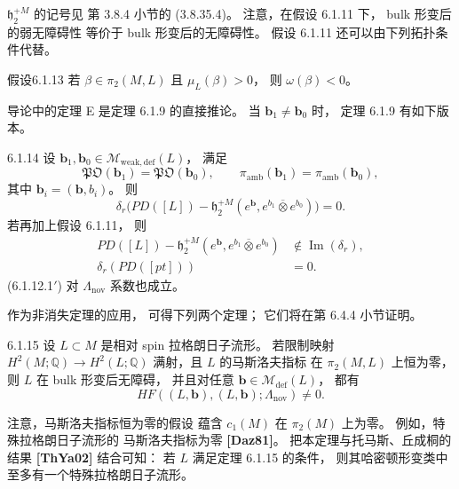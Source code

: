 $\mathfrak h_2^{+M}$ 的记号见
第 3.8.4 小节的 (3.8.35.4)。
注意，在假设 6.1.11 下，
bulk 形变后的弱无障碍性
等价于 bulk 形变后的无障碍性。
假设 6.1.11 还可以由下列拓扑条件代替。

\begin{statement}{假设}{6.1.13}\label{ass:6-1-13}
若 $\beta\in\pi_2(M,L)$ 且
$\mu_L(\beta)>0$，
则 $\omega(\beta)<0$。
\end{statement}

导论中的定理 E 是定理 6.1.9 的直接推论。
当 $\mathbf b_1\ne\mathbf b_0$ 时，
定理 6.1.9 有如下版本。

\begin{theorem}{6.1.14}\label{thm:6-1-14}
设 $\mathbf b_1,\mathbf b_0
\in\mathcal M_{\mathrm{weak,def}}(L)$，
满足
\[
\mathfrak{PO}(\mathbf b_1)=\mathfrak{PO}(\mathbf b_0),
\qquad
\pi_{\mathrm{amb}}(\mathbf b_1)
=\pi_{\mathrm{amb}}(\mathbf b_0),
\]
其中 $\mathbf b_i=(\boldsymbol b,b_i)$。
则
\begin{equation}
\delta_r\bigl(
PD([L])-\mathfrak h_2^{+M}
(e^{\boldsymbol b},e^{b_1}\mathbin{\overline\otimes}e^{b_0})
\bigr)=0.
\tag{6.1.10.1$'$}\label{eq:6-1-10-1-prime}
\end{equation}
若再加上假设 6.1.11，
则
\begin{align}
PD([L])-\mathfrak h_2^{+M}
(e^{\boldsymbol b},e^{b_1}\mathbin{\overline\otimes}e^{b_0})
&\notin\operatorname{Im}(\delta_r),
\tag{6.1.12.1$'$}\label{eq:6-1-12-1-prime}\\
\delta_r(PD([pt]))&=0.
\tag{6.1.12.2$'$}\label{eq:6-1-12-2-prime}
\end{align}
\textup{(6.1.12.1$'$)} 对
$\Lambda_{\mathrm{nov}}$ 系数也成立。
\end{theorem}

作为非消失定理的应用，
可得下列两个定理；
它们将在第 6.4.4 小节证明。

\begin{theorem}{6.1.15}\label{thm:6-1-15}
设 $L\subset M$ 是相对 spin 拉格朗日子流形。
若限制映射
$H^2(M;\mathbb Q)\to H^2(L;\mathbb Q)$
满射，且 $L$ 的马斯洛夫指标
在 $\pi_2(M,L)$ 上恒为零，
则 $L$ 在 bulk 形变后无障碍，
并且对任意
$\mathbf b\in\mathcal M_{\mathrm{def}}(L)$，
都有
\[
HF((L,\mathbf b),(L,\mathbf b);
\Lambda_{\mathrm{nov}})\ne0.
\]
\end{theorem}

注意，马斯洛夫指标恒为零的假设
蕴含 $c_1(M)$ 在 $\pi_2(M)$ 上为零。
例如，特殊拉格朗日子流形的
马斯洛夫指标为零 \textbf{[Daz81]}。
把本定理与托马斯、丘成桐的结果
\textbf{[ThYa02]} 结合可知：
若 $L$ 满足定理 6.1.15 的条件，
则其哈密顿形变类中
至多有一个特殊拉格朗日子流形。

